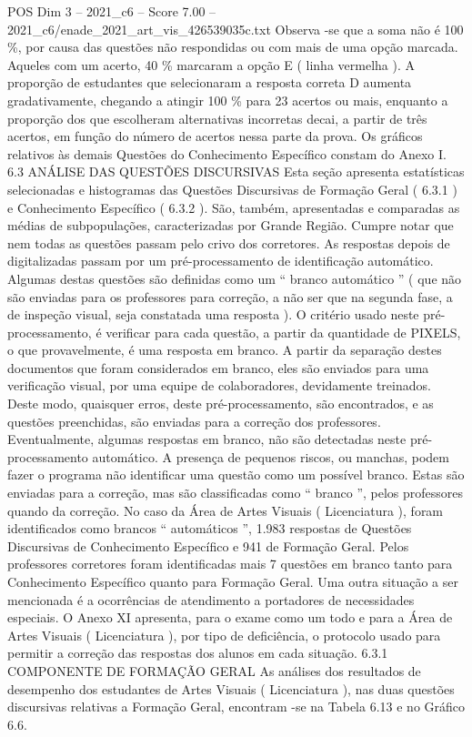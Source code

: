 \begin{textsample}{POS Dim 3 – 2021\_c6 – Score 7.00 – 2021\_c6/enade\_2021\_art\_vis\_426539035c.txt}
Observa -se que a soma não é 100 \%, por causa das questões não respondidas ou com mais de uma opção marcada.
Aqueles com um acerto, 40 \% marcaram a opção E ( linha vermelha ).
A proporção de estudantes que selecionaram a resposta correta D aumenta gradativamente, chegando a atingir 100 \% para 23 acertos ou mais, enquanto a proporção dos que escolheram alternativas incorretas decai, a partir de três acertos, em função do número de acertos nessa parte da prova.
Os gráficos relativos às demais Questões do Conhecimento Específico constam do Anexo I. 6.3 ANÁLISE DAS QUESTÕES DISCURSIVAS Esta seção apresenta estatísticas selecionadas e histogramas das Questões Discursivas de Formação Geral ( 6.3.1 ) e Conhecimento Específico ( 6.3.2 ).
São, também, apresentadas e comparadas as médias de subpopulações, caracterizadas por Grande Região.
Cumpre notar que nem todas as questões passam pelo crivo dos corretores.
As respostas depois de digitalizadas passam por um pré-processamento de identificação automático.
Algumas destas questões são definidas como um “ branco automático ” ( que não são enviadas para os professores para correção, a não ser que na segunda fase, a de inspeção visual, seja constatada uma resposta ).
O critério usado neste pré-processamento, é verificar para cada questão, a partir da quantidade de PIXELS, o que provavelmente, é uma resposta em branco.
A partir da separação destes documentos que foram considerados em branco, eles são enviados para uma verificação visual, por uma equipe de colaboradores, devidamente treinados.
Deste modo, quaisquer erros, deste pré-processamento, são encontrados, e as questões preenchidas, são enviadas para a correção dos professores.
Eventualmente, algumas respostas em branco, não são detectadas neste pré-processamento automático.
A presença de pequenos riscos, ou manchas, podem fazer o programa não identificar uma questão como um possível branco.
Estas são enviadas para a correção, mas são classificadas como “ branco ”, pelos professores quando da correção.
No caso da Área de Artes Visuais ( Licenciatura ), foram identificados como brancos “ automáticos ”, 1.983 respostas de Questões Discursivas de Conhecimento Específico e 941 de Formação Geral.
Pelos professores corretores foram identificadas mais 7 questões em branco tanto para Conhecimento Específico quanto para Formação Geral.
Uma outra situação a ser mencionada é a ocorrências de atendimento a portadores de necessidades especiais.
O Anexo XI apresenta, para o exame como um todo e para a Área de Artes Visuais ( Licenciatura ), por tipo de deficiência, o protocolo usado para permitir a correção das respostas dos alunos em cada situação. 6.3.1 COMPONENTE DE FORMAÇÃO GERAL As análises dos resultados de desempenho dos estudantes de Artes Visuais ( Licenciatura ), nas duas questões discursivas relativas a Formação Geral, encontram -se na Tabela 6.13 e no Gráfico 6.6.

\end{textsample}
